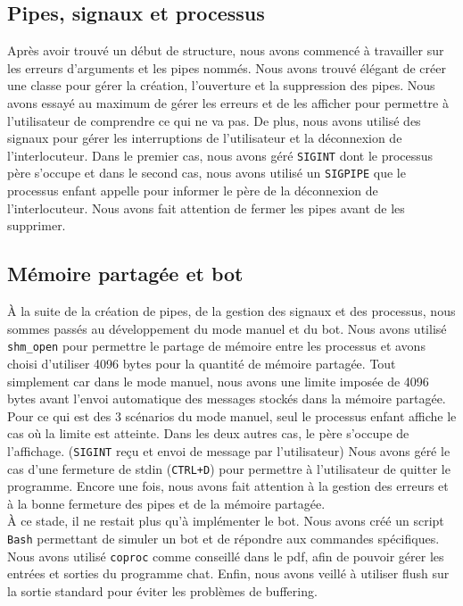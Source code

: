 \documentclass{article}
\begin{document}
\subsection{Pipes, signaux et processus}
\label{pipes-signaux-et-processus}


Après avoir trouvé un début de structure, nous avons commencé à travailler sur les erreurs d'arguments et les pipes nommés. 
Nous avons trouvé élégant de créer une classe pour gérer la création, l'ouverture et la suppression des pipes.
Nous avons essayé au maximum de gérer les erreurs et de les afficher pour permettre à l'utilisateur de comprendre ce qui ne va pas.
De plus, nous avons utilisé des signaux pour gérer les interruptions de l'utilisateur et la déconnexion de l'interlocuteur.
Dans le premier cas, nous avons géré \texttt{SIGINT} dont le processus père s'occupe et dans le second cas, nous avons utilisé un \texttt{SIGPIPE} 
que le processus enfant appelle pour informer le père de la déconnexion de l'interlocuteur. 
Nous avons fait attention de fermer les pipes avant de les supprimer.



\subsection{Mémoire partagée et bot}
\label{memoire-partagee-et-bot}


À la suite de la création de pipes, de la gestion des signaux et des processus, nous sommes passés au développement du mode manuel et du bot.
Nous avons utilisé \texttt{shm\_open} pour permettre le partage de mémoire entre les processus et avons choisi d'utiliser 4096 bytes pour la quantité de mémoire partagée.
Tout simplement car dans le mode manuel, nous avons une limite imposée de 4096 bytes avant l'envoi automatique des messages stockés dans la mémoire partagée.
Pour ce qui est des 3 scénarios du mode manuel, seul le processus enfant affiche le cas où la limite est atteinte.
Dans les deux autres cas, le père s'occupe de l'affichage. (\texttt{SIGINT} reçu et envoi de message par l'utilisateur)
Nous avons géré le cas d'une fermeture de stdin (\texttt{CTRL+D}) pour permettre à l'utilisateur de quitter le programme.
Encore une fois, nous avons fait attention à la gestion des erreurs et à la bonne fermeture des pipes et de la mémoire partagée.\\

À ce stade, il ne restait plus qu'à implémenter le bot. Nous avons créé un script \texttt{Bash} permettant de simuler un bot et de répondre aux commandes spécifiques.
Nous avons utilisé \texttt{coproc} comme conseillé dans le pdf, afin de pouvoir gérer les entrées et sorties du programme chat.
Enfin, nous avons veillé à utiliser flush sur la sortie standard pour éviter les problèmes de buffering.
\end{document}
